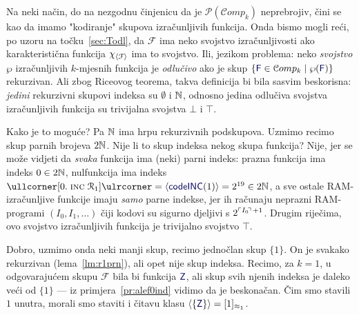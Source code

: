 Na neki način, do na nezgodnu činjenicu da je $\mathcal P(\mathcal Comp_k)$ neprebrojiv, čini se kao da imamo "kodiranje" skupova izračunljivih funkcija. Onda bismo mogli reći, po uzoru na točku~\ref{sec:Todl}, da $\mathcal F$ ima neko svojstvo izračunljivosti ako karakteristična funkcija $\chi_{\langle\mathcal F\rangle}$ ima to svojstvo. Ili, jezikom problema: neko \emph{svojstvo} $\wp$ izračunljivih $k$-mjesnih funkcija je \emph{odlučivo} ako je skup $\{\f F\in\mathcal Comp_k\mid\wp(\f F)\}$ rekurzivan. Ali zbog Riceovog teorema, takva definicija bi bila sasvim beskorisna: \emph{jedini} rekurzivni skupovi indeksa su $\emptyset$ i ${\mathbb N}$, odnosno jedina odlučiva svojstva izračunljivih funkcija su trivijalna svojstva $\bot$ i $\top$.


Kako je to moguće? Pa ${\mathbb N}$ ima hrpu rekurzivnih podskupova. Uzmimo recimo skup parnih brojeva $2{\mathbb N}$. Nije li to skup indeksa nekog skupa funkcija? Nije, jer se može vidjeti da \emph{svaka} funkcija ima (neki) parni indeks: prazna funkcija ima indeks $0\in2{\mathbb N}$, nulfunkcija ima indeks $\kprog{[0.\;\incr1]}=\kr{\f{codeINC}(1)}=2^{19}\in2\N$, a sve ostale RAM-izračunljive funkcije imaju \emph{samo} parne indekse, jer ih računaju neprazni RAM-programi $(I_0,I_1,\dotsc)$ čiji kodovi su sigurno djeljivi s $2^{\ulcorner I_0\!\urcorner\,+1}$. Drugim riječima, ovo svojstvo izračunljivih funkcija je trivijalno svojstvo $\top$.

Dobro, uzmimo onda neki manji skup, recimo jednočlan skup $\{1\}$. On je svakako rekurzivan (lema~\ref{lm:r1prn}), ali opet nije skup indeksa. Recimo, za $k=1$, u odgovarajućem skupu $\mathcal F$ bila bi funkcija $\f Z$, ali skup svih njenih indeksa je daleko veći od $\{1\}$ --- iz primjera~\ref{pr:alef0ind} vidimo da je beskonačan. Čim smo stavili $1$ unutra, morali smo staviti i čitavu klasu $\kr{\{\f Z\}}=[1]_{\approx_1}$.

